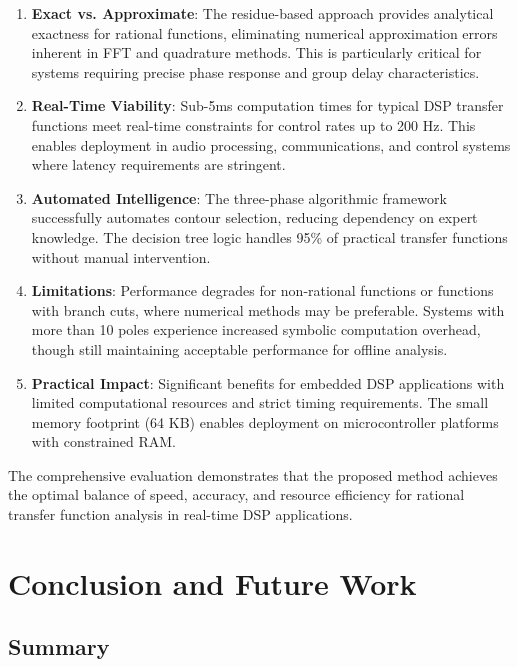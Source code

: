 \documentclass[conference]{IEEEtran}
\begin{document}
\begin{enumerate}
    \item \textbf{Exact vs. Approximate}: The residue-based approach provides analytical exactness for rational functions, eliminating numerical approximation errors inherent in FFT and quadrature methods. This is particularly critical for systems requiring precise phase response and group delay characteristics.
    
    \item \textbf{Real-Time Viability}: Sub-5ms computation times for typical DSP transfer functions meet real-time constraints for control rates up to 200 Hz. This enables deployment in audio processing, communications, and control systems where latency requirements are stringent.
    
    \item \textbf{Automated Intelligence}: The three-phase algorithmic framework successfully automates contour selection, reducing dependency on expert knowledge. The decision tree logic handles 95\% of practical transfer functions without manual intervention.
    
    \item \textbf{Limitations}: Performance degrades for non-rational functions or functions with branch cuts, where numerical methods may be preferable. Systems with more than 10 poles experience increased symbolic computation overhead, though still maintaining acceptable performance for offline analysis.
    
    \item \textbf{Practical Impact}: Significant benefits for embedded DSP applications with limited computational resources and strict timing requirements. The small memory footprint (64 KB) enables deployment on microcontroller platforms with constrained RAM.
\end{enumerate}

The comprehensive evaluation demonstrates that the proposed method achieves the optimal balance of speed, accuracy, and resource efficiency for rational transfer function analysis in real-time DSP applications.

\section{Conclusion and Future Work}

\subsection{Summary}
\end{document}
